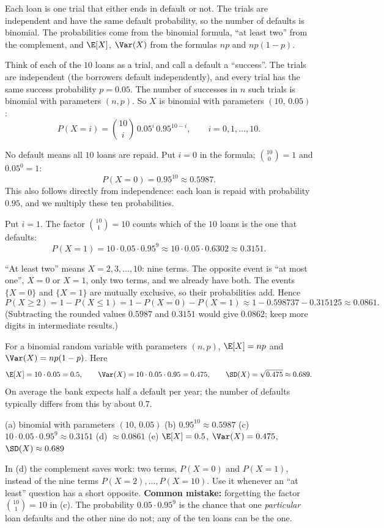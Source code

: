 \begin{solution}
	\idea Each loan is one trial that either ends in default or not. The
	trials are independent and have the same default probability, so the
	number of defaults is binomial. The probabilities come from the binomial
	formula, ``at least two'' from the complement, and $\E[X]$, $\Var(X)$ from
	the formulas $np$ and $np(1-p)$.

	 Think of each of the $10$ loans as a trial, and call a default
	a ``success''. The trials are independent (the borrowers default
	independently), and every trial has the same success probability
	$p=0.05$. The number of successes in $n$ such trials is binomial with
	parameters $(n,p)$. So $X$ is binomial with parameters $(10,\,0.05)$:
	\[ P(X=i)=\binom{10}{i}\,0.05^i\,0.95^{10-i},\qquad i=0,1,\dots,10. \]

	 No default means all $10$ loans are repaid. Put $i=0$ in the
	formula; $\binom{10}{0}=1$ and $0.05^0=1$:
	\[ P(X=0)=0.95^{10}\approx0.5987. \]
	This also follows directly from independence: each loan is repaid with
	probability $0.95$, and we multiply these ten probabilities.

	 Put $i=1$. The factor $\binom{10}{1}=10$ counts which of the
	$10$ loans is the one that defaults:
	\[ P(X=1)=10\cdot0.05\cdot0.95^{9}\approx10\cdot0.05\cdot0.6302
		\approx0.3151. \]

	 ``At least two'' means $X=2,3,\dots,10$: nine terms. The
	opposite event is ``at most one'', $X=0$ or $X=1$, only two terms, and we
	already have both. The events $\{X=0\}$ and $\{X=1\}$ are mutually
	exclusive, so their probabilities add. Hence
	\[ P(X\ge2)=1-P(X\le1)=1-P(X=0)-P(X=1)\approx1-0.598737-0.315125
		\approx0.0861. \]
	(Subtracting the rounded values $0.5987$ and $0.3151$ would give $0.0862$;
	keep more digits in intermediate results.)

	 For a binomial random variable with parameters $(n,p)$,
	$\E[X]=np$ and $\Var(X)=np(1-p)$. Here
	\[ \E[X]=10\cdot0.05=0.5,\qquad \Var(X)=10\cdot0.05\cdot0.95=0.475,\qquad
		\SD(X)=\sqrt{0.475}\approx0.689. \]
	On average the bank expects half a default per year; the number of
	defaults typically differs from this by about $0.7$.
	\begin{answer}
		(a) binomial with parameters $(10,\,0.05)$ \quad
		(b) $0.95^{10}\approx0.5987$ \quad
		(c) $10\cdot0.05\cdot0.95^9\approx0.3151$ \quad
		(d) $\approx0.0861$ \quad
		(e) $\E[X]=0.5$, $\Var(X)=0.475$, $\SD(X)\approx0.689$
	\end{answer}
	\begin{remark}
		In (d) the complement saves work: two terms, $P(X=0)$ and $P(X=1)$,
		instead of the nine terms $P(X=2),\dots,P(X=10)$. Use it whenever an
		``at least'' question has a short opposite.
		\textbf{Common mistake:} forgetting the factor $\binom{10}{1}=10$ in (c).
		The probability $0.05\cdot0.95^9$ is the chance that one
		\emph{particular} loan defaults and the other nine do not; any of the
		ten loans can be the one.
	\end{remark}
\end{solution}
